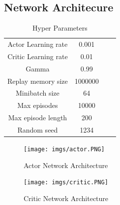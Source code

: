 \documentclass[11pt,twocolumn]{jarticle} %
\begin{document}
\subsection{Network Architecure}

\begin{table}[ht]
 \caption{Hyper Parameters} 
 \label{tbl:hyperparameters}
  \begin{center}
    \begin{tabular}{c|ccc}
  \hline \hline
  Actor Learning rate  & 0.001   \\
  Critic Learning rate & 0.01    \\
  Gamma                & 0.99    \\
  Replay memory size   & 1000000 \\
  Minibatch size       & 64      \\
  Max episodes         & 10000   \\
  Max episode length   & 200     \\
  Random seed          & 1234    \\\hline
    \end{tabular}
  \end{center}
\end{table}

\begin{figure}[h]
 \begin{center}
  \texttt{[image: imgs/actor.PNG]}
  \caption{Actor Network Architecture}\label{fig:Actor}
 \end{center}
\end{figure}

\begin{figure}[h]
 \begin{center}
  \texttt{[image: imgs/critic.PNG]}
  \caption{Critic Network Architecture}\label{fig:Critic}
 \end{center}
\end{figure}
\end{document}

